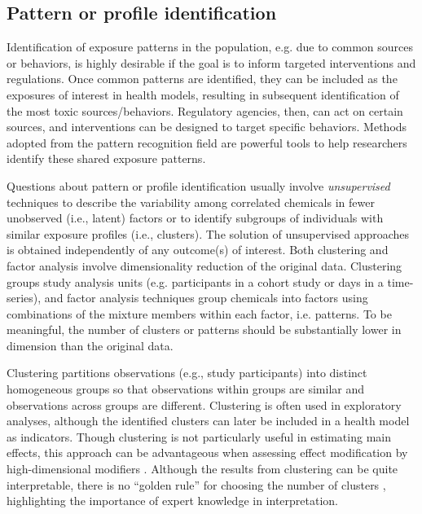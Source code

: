 \subsection{Pattern or profile identification}\label{sec:Patterns}

Identification of exposure patterns in the population, e.g. due to common sources or behaviors, is highly desirable if the goal is to inform targeted interventions and regulations. Once common patterns are identified, they can be included as the exposures of interest in health models, resulting in subsequent identification of the most toxic sources/behaviors. Regulatory agencies, then, can act on certain sources, and interventions can be designed to target specific behaviors. Methods adopted from the pattern recognition field are powerful tools to help researchers identify these shared exposure patterns. 

Questions about pattern or profile identification usually involve \textit{unsupervised} techniques to describe the variability among correlated chemicals in fewer unobserved (i.e., latent) factors or to identify subgroups of individuals with similar exposure profiles (i.e., clusters). The solution of unsupervised approaches is obtained independently of any outcome(s) of interest. Both clustering and factor analysis involve dimensionality reduction of the original data. Clustering groups study analysis units (e.g. participants in a cohort study or days in a time-series), and factor analysis techniques group chemicals into factors using combinations of the mixture members within each factor, i.e. patterns. To be meaningful, the number of clusters or patterns should be substantially lower in dimension than the original data. 

Clustering partitions observations (e.g., study participants) into distinct homogeneous groups so that observations within groups are similar and observations across groups are different. Clustering is often used in exploratory analyses, although the identified clusters can later be included in a health model as indicators. Though clustering is not particularly useful in estimating main effects, this approach can be advantageous when assessing effect modification by high-dimensional modifiers \citep{mak15_clusters}. Although the results from clustering can be quite interpretable, there is no ``golden rule'' for choosing the number of clusters \citep{ISLR}, highlighting the importance of expert knowledge in interpretation.

